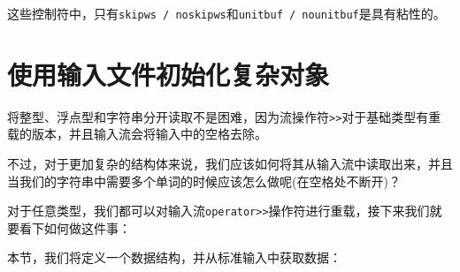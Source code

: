 这些控制符中，只有\texttt{skipws / noskipws}和\texttt{unitbuf / nounitbuf}是具有粘性的。


\section{使用输入文件初始化复杂对象}

将整型、浮点型和字符串分开读取不是困难，因为流操作符\texttt{>>}对于基础类型有重载的版本，并且输入流会将输入中的空格去除。

不过，对于更加复杂的结构体来说，我们应该如何将其从输入流中读取出来，并且当我们的字符串中需要多个单词的时候应该怎么做呢(在空格处不断开)？

对于任意类型，我们都可以对输入流\texttt{operator>>}操作符进行重载，接下来我们就要看下如何做这件事：


本节，我们将定义一个数据结构，并从标准输入中获取数据：

